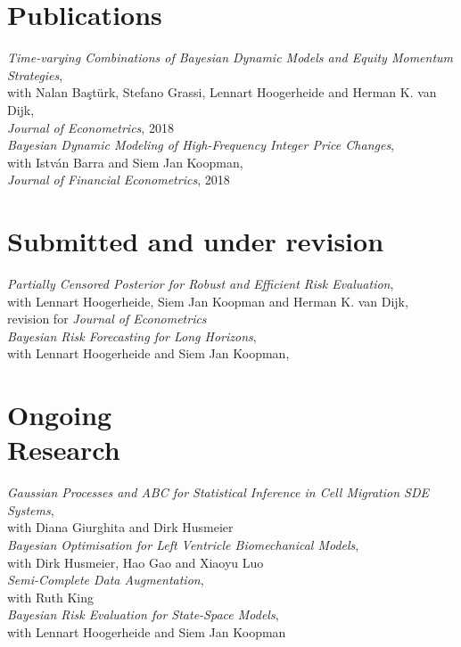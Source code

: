 \documentclass[margin,line]{resume}
\begin{document}
\begin{resume}
\vspace{-4mm}
\section{\mysidestyle Publications}
\textit{Time-varying Combinations of Bayesian Dynamic Models and Equity Momentum Strategies},\\
	with Nalan Ba\c{s}t\"{u}rk, Stefano Grassi, Lennart Hoogerheide and Herman K. van Dijk,\\
	\textit{Journal of Econometrics}, 2018 \vspace{1mm} \\
\textit{Bayesian Dynamic Modeling of High-Frequency Integer Price Changes},\\
	with Istv\'{a}n Barra  and Siem Jan Koopman,\\
	\textit{Journal of Financial Econometrics}, 2018  \vspace{-5mm} \\ 
	 	
\section{\mysidestyle Submitted and under revision}	
\textit{Partially Censored Posterior for Robust and Efficient Risk Evaluation},\\
	with Lennart Hoogerheide, Siem Jan Koopman and Herman K. van Dijk,\\
	revision for \textit{Journal of Econometrics} \vspace{1mm}\\ 
\textit{Bayesian Risk Forecasting for Long Horizons},\\
	with Lennart Hoogerheide and Siem Jan Koopman, \vspace{-5mm} \\ 
		 	
\section{\mysidestyle Ongoing \\Research } 
   	\textit{Gaussian Processes and ABC for Statistical Inference in Cell Migration SDE Systems},\\ 
    with Diana Giurghita and Dirk Husmeier\vspace{1mm} \\
   	\textit{Bayesian Optimisation for Left Ventricle Biomechanical Models},\\ 
    with Dirk Husmeier, Hao Gao and Xiaoyu Luo \vspace{1mm} \\   	
   	\textit{Semi-Complete Data Augmentation},\\ 
    with Ruth King \vspace{1mm} \\   
   	\textit{Bayesian Risk Evaluation for State-Space Models},\\ 
    with Lennart Hoogerheide and Siem Jan Koopman\vspace{1mm} \\  
      

\end{resume}
\end{document}

